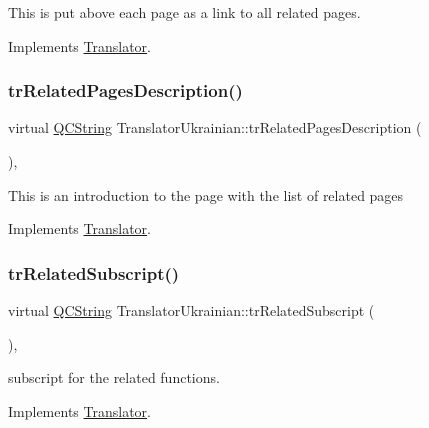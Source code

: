 This is put above each page as a link to all related pages. 

Implements \mbox{\hyperlink{class_translator}{Translator}}.

\mbox{\label{class_translator_ukrainian_a288b199d341c77be60b3769364621d59}} 
\subsubsection{\texorpdfstring{trRelatedPagesDescription()}{trRelatedPagesDescription()}}
{\footnotesize\ttfamily virtual \mbox{\hyperlink{class_q_c_string}{Q\+C\+String}} Translator\+Ukrainian\+::tr\+Related\+Pages\+Description (\begin{DoxyParamCaption}{ }\end{DoxyParamCaption})\hspace{0.3cm}{\ttfamily [inline]}, {\ttfamily [virtual]}}

This is an introduction to the page with the list of related pages 

Implements \mbox{\hyperlink{class_translator}{Translator}}.

\mbox{\label{class_translator_ukrainian_a6251c714352393ba510791ab3e0129ae}} 
\subsubsection{\texorpdfstring{trRelatedSubscript()}{trRelatedSubscript()}}
{\footnotesize\ttfamily virtual \mbox{\hyperlink{class_q_c_string}{Q\+C\+String}} Translator\+Ukrainian\+::tr\+Related\+Subscript (\begin{DoxyParamCaption}{ }\end{DoxyParamCaption})\hspace{0.3cm}{\ttfamily [inline]}, {\ttfamily [virtual]}}

subscript for the related functions. 

Implements \mbox{\hyperlink{class_translator}{Translator}}.

\mbox{\label{class_translator_ukrainian_a9b0d54740b614522f6ce6b91b7fbc647}} 
